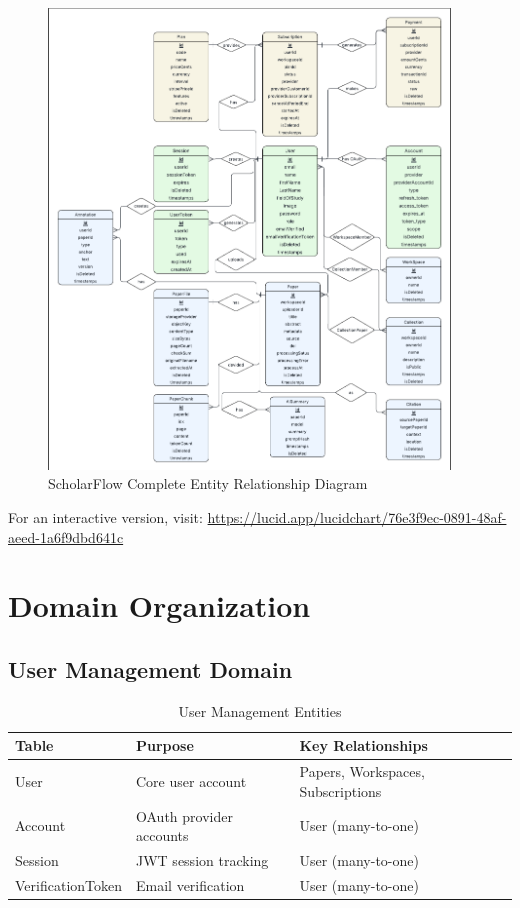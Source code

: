 \begin{figure}[H]
\centering
\includegraphics[width=0.95\textwidth]{images/diagrams/ERD.png}
\caption{ScholarFlow Complete Entity Relationship Diagram}
\label{fig:erd-complete}
\end{figure}

\noindent For an interactive version, visit: \url{https://lucid.app/lucidchart/76e3f9ec-0891-48af-aeed-1a6f9dbd641c}

\section{Domain Organization}
\label{sec:erd-domains}

\subsection{User Management Domain}

\begin{table}[H]
\centering
\caption{User Management Entities}
\label{tab:erd-user-domain}
\begin{tabular}{@{}llp{6cm}@{}}
\toprule
\textbf{Table} & \textbf{Purpose} & \textbf{Key Relationships} \\
\midrule
User & Core user account & Papers, Workspaces, Subscriptions \\
Account & OAuth provider accounts & User (many-to-one) \\
Session & JWT session tracking & User (many-to-one) \\
VerificationToken & Email verification & User (many-to-one) \\
\bottomrule
\end{tabular}
\end{table}

